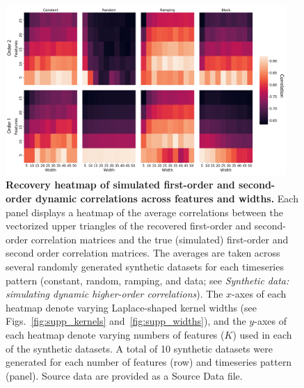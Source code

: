 \documentclass[english]{article}
\begin{document}
\begin{figure}[p!]
\centering
\includegraphics[width=0.95\textwidth]{figs/sim_heatmaps_features}
  \caption{\textbf{Recovery heatmap of simulated first-order and
      second-order dynamic correlations across features and widths.}  Each panel displays a
    heatmap of the average correlations
    between the vectorized upper triangles of the recovered
    first-order and second-order correlation matrices and the true
    (simulated) first-order and second order correlation matrices.
    The averages are taken across several randomly generated
    synthetic datasets for each timeseries pattern (constant, random,
    ramping, and data; see \textit{Synthetic data: simulating dynamic higher-order
      correlations}).  The $x$-axes of each heatmap denote varying
    Laplace-shaped kernel widths (see Figs.~\ref{fig:supp_kernels}
    and~\ref{fig:supp_widths}), and the $y$-axes of each heatmap
    denote varying numbers of features ($K$) used in each of the synthetic datasets.
    A total of 10 synthetic datasets were generated for each number of features
    (row) and timeseries pattern (panel). Source data are provided as a Source Data file.}
\label{fig:features}
\end{figure}
\end{document}
